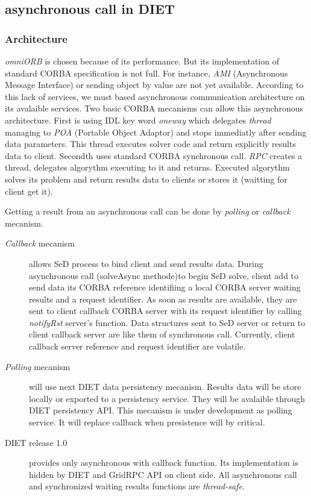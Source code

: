   \subsection{asynchronous call in DIET}

  \subsubsection{Architecture}

  \emph{omniORB} is chosen because of its performance. But its implementation
  of standard CORBA specification is not full. For instance, \emph{AMI}
  (Asynchronous Message Interface) or sending object by value are not yet
  available. According to this lack of services, we must based asynchronous
  communication architecture on its avalaible services.
  Two basic CORBA mecanisms can allow this asynchronous architecture.
  First is using IDL key word \emph{oneway} which delegates \emph{thread} managing
  to \emph{POA} (Portable Object Adaptor) and stops immediatly after sending data parameters. This thread
  executes solver code and return explicitly results data to client.
  Secondth uses standard CORBA synchronous call.
  \emph{RPC} creates a thread, delegates algorythm executing to it and returns.
  Executed algorythm solves its problem and return results data to clients or stores
  it (waitting for client get it).

  Getting a result from an asynchronous call can be done by \emph{polling} or
  \emph{callback} mecanism.

  \begin{description}
  \item[\emph{Callback} mecanism] allows SeD process to bind client and send results data.
  During asynchronous call (solveAsync methode)to begin SeD solve, client
  add to send data its CORBA reference identifiing a local CORBA server
  waiting results and a request identifier.
  As soon as results are available, they are sent to client callback CORBA server
  with its request identifier by calling \emph{notifyRst} server's function.
  Data structures sent to SeD server or return to client callback server are like
  them of synchronous call. Currently, client callback server reference and request
  identifier are volatile.
  \item[\emph{Polling} mecanism] will use next DIET data persistency mecanism.
  Results data will be store locally or exported to a persistency service.
  They will be avalaible through DIET persistency API. This mecanism is under
  development as polling service. It will replace callback when presistence will
  by critical.
  \item[DIET release 1.0] provides only asynchronous with callback function. Its
  implementation is hidden by DIET and GridRPC API on client side. All asynchronous call
  and synchronized waiting results functions are \emph{thread-safe}.
  \end{description}

